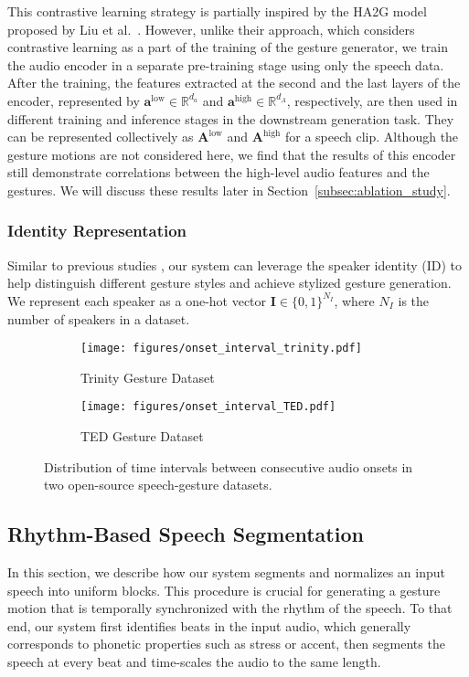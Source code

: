\documentclass[acmtog,authorversion]{acmart}
\newcommand{\vect}[1]{\bm{#1}}
\newcommand{\eqword}[1]{{\text{#1}}}
\begin{document}
This contrastive learning strategy is partially inspired by the HA2G model proposed by Liu et al.~. However, unlike their approach, which considers contrastive learning as a part of the training of the gesture generator, we train the audio encoder in a separate pre-training stage using only the speech data. After the training, the features extracted at the second and the last layers of the encoder, represented by $\vect{a}^{\eqword{low}}\in\mathbb{R}^{d_a}$ and $\vect{a}^{\eqword{high}}\in\mathbb{R}^{d_A}$, respectively, are then used in different training and inference stages in the downstream generation task. They can be represented collectively as $\vect{A}^{\eqword{low}}$ and $\vect{A}^{\eqword{high}}$ for a speech clip. Although the gesture motions are not considered here, we find that the results of this encoder still demonstrate correlations between the high-level audio features and the gestures. We will discuss these results later in Section~\ref{subsec:ablation_study}.

\subsubsection{Identity Representation}
Similar to previous studies \cite{yoon2020speech,bhattacharya2021speech2affectivegestures}, our system can leverage the speaker identity (ID) to help distinguish different gesture styles and achieve stylized gesture generation. We represent each speaker as a one-hot vector $\vect{I}\in\{0,1\}^{N_I}$, where $N_I$ is the number of speakers in a dataset.
\begin{figure}[t]
    \centering    
    \begin{subfigure}[t]{0.47\linewidth}
        \centering
        \caption*{Trinity Gesture Dataset}
        \texttt{[image: figures/onset\_interval\_trinity.pdf]}
   \end{subfigure}
   \hspace{\fill}
    \begin{subfigure}[t]{0.47\linewidth}
        \centering
        \caption*{TED Gesture Dataset}
        \texttt{[image: figures/onset\_interval\_TED.pdf]}
   \end{subfigure}
    \caption{Distribution of time intervals between consecutive audio onsets in two open-source speech-gesture datasets.}
    \Description{}
    \label{fig:onset_intervals}
\end{figure}
\subsection{Rhythm-Based Speech Segmentation}
\label{subsec:beat_alignment}
In this section, we describe how our system segments and normalizes an input speech into uniform blocks. This procedure is crucial for generating a gesture motion that is temporally synchronized with the rhythm of the speech. To that end, our system first identifies beats in the input audio, which generally corresponds to phonetic properties such as stress or accent, then segments the speech at every beat and time-scales the audio to the same length.
\end{document}
